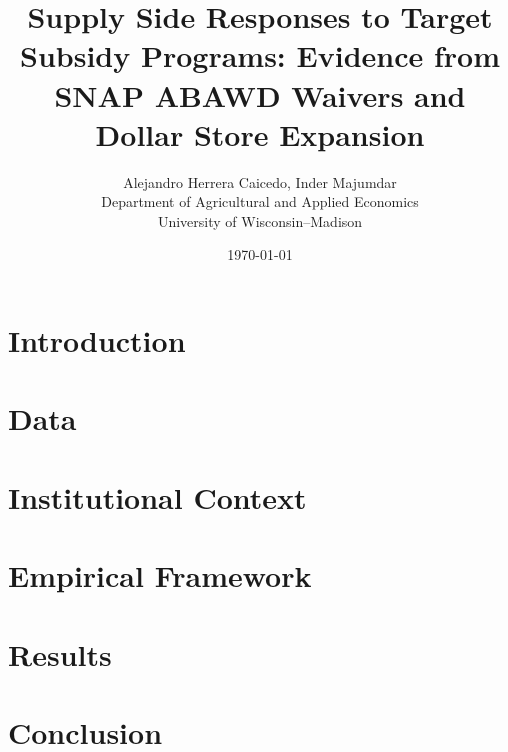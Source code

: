 \documentclass[12pt]{article}
\title{Supply Side Responses to Target Subsidy Programs: Evidence from SNAP ABAWD Waivers and Dollar Store Expansion\\[0.5em]}
\author{Alejandro Herrera Caicedo, Inder Majumdar \\ Department of Agricultural and Applied Economics \\ University of Wisconsin–Madison}
\date{\today}
\begin{document}
\linenumbers

\maketitle

\section{Introduction}

\section{Data}

\section{Institutional Context}

\section{Empirical Framework}

\section{Results}

\section{Conclusion}

\nocite{*}                      %
\end{document}
